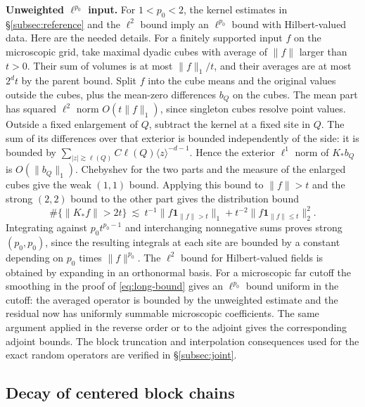 \documentclass[11pt]{article}
\begin{document}
\textbf{Unweighted \(\ell^{p_0}\) input.} For \(1<p_0<2\), the kernel estimates in \S\ref{subsec:reference} and the \(\ell^2\) bound imply an \(\ell^{p_0}\) bound with Hilbert-valued data. Here are the needed details. For a finitely supported input \(f\) on the microscopic grid, take maximal dyadic cubes with average of \(\|f\|\) larger than \(t>0\). Their sum of volumes is at most \(\|f\|_1/t\), and their averages are at most \(2^d t\) by the parent bound. Split \(f\) into the cube means and the original values outside the cubes, plus the mean-zero differences \(b_Q\) on the cubes. The mean part has squared \(\ell^2\) norm \(O(t\|f\|_1)\), since singleton cubes resolve point values. Outside a fixed enlargement of \(Q\), subtract the kernel at a fixed site in \(Q\). The sum of its differences over that exterior is bounded independently of the side: it is bounded by \(\sum_{|z|\gtrsim \ell(Q)} C\ell(Q)\langle z\rangle^{-d-1}\). Hence the exterior \(\ell^1\) norm of \(K_* b_Q\) is \(O(\|b_Q\|_1)\). Chebyshev for the two parts and the measure of the enlarged cubes give the weak \((1,1)\) bound. Applying this bound to \(\|f\|>t\) and the strong \((2,2)\) bound to the other part gives the distribution bound \[
 \#\{\|K_* f\|>2t\}\ \lesssim\
 t^{-1}\|f\mathbf1_{\|f\|>t}\|_1+
 t^{-2}\|f\mathbf1_{\|f\|\le t}\|_2^2.
\] Integrating against \(p_0 t^{p_0-1}\) and interchanging nonnegative sums proves strong \((p_0,p_0)\), since the resulting integrals at each site are bounded by a constant depending on \(p_0\) times \(\|f\|^{p_0}\). The \(\ell^2\) bound for Hilbert-valued fields is obtained by expanding in an orthonormal basis. For a microscopic far cutoff the smoothing in the proof of \eqref{eq:long-bound} gives an \(\ell^{p_0}\) bound uniform in the cutoff: the averaged operator is bounded by the unweighted estimate and the residual now has uniformly summable microscopic coefficients. The same argument applied in the reverse order or to the adjoint gives the corresponding adjoint bounds. The block truncation and interpolation consequences used for the exact random operators are verified in \S\ref{subsec:joint}.

\subsection{Decay of centered block chains}\label{subsec:chain}
\end{document}
